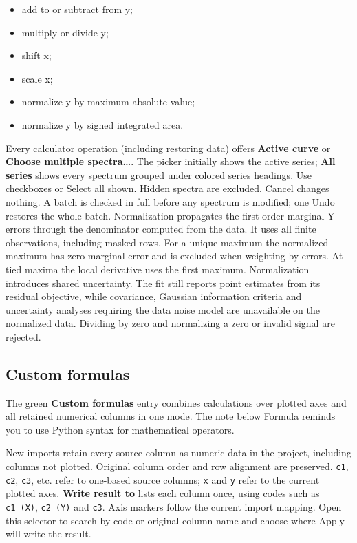 \documentclass[
  10pt,
  a4paper,
  oneside]{scrreprt}
\providecommand{\tightlist}{%
  \setlength{\itemsep}{0pt}\setlength{\parskip}{0pt}}
\begin{document}
\begin{itemize}
\tightlist
\item
  add to or subtract from y;
\item
  multiply or divide y;
\item
  shift x;
\item
  scale x;
\item
  normalize y by maximum absolute value;
\item
  normalize y by signed integrated area.
\end{itemize}

Every calculator operation (including restoring data) offers
\textbf{Active curve} or \textbf{Choose multiple spectra\ldots{}}. The
picker initially shows the active series; \textbf{All series} shows
every spectrum grouped under colored series headings. Use checkboxes or
Select all shown. Hidden spectra are excluded. Cancel changes nothing. A
batch is checked in full before any spectrum is modified; one Undo
restores the whole batch. Normalization propagates the first-order
marginal Y errors through the denominator computed from the data. It
uses all finite observations, including masked rows. For a unique
maximum the normalized maximum has zero marginal error and is excluded
when weighting by errors. At tied maxima the local derivative uses the
first maximum. Normalization introduces shared uncertainty. The fit
still reports point estimates from its residual objective, while
covariance, Gaussian information criteria and uncertainty analyses
requiring the data noise model are unavailable on the normalized data.
Dividing by zero and normalizing a zero or invalid signal are rejected.

\hypertarget{custom-formulas}{%
\subsection{Custom formulas}\label{custom-formulas}}

The green \textbf{Custom formulas} entry combines calculations over
plotted axes and all retained numerical columns in one mode. The note
below Formula reminds you to use Python syntax for mathematical
operators.

New imports retain every source column as numeric data in the project,
including columns not plotted. Original column order and row alignment
are preserved. \texttt{c1}, \texttt{c2}, \texttt{c3}, etc. refer to
one-based source columns; \texttt{x} and \texttt{y} refer to the current
plotted axes. \textbf{Write result to} lists each column once, using
codes such as \texttt{c1\ (X)}, \texttt{c2\ (Y)} and \texttt{c3}. Axis
markers follow the current import mapping. Open this selector to search
by code or original column name and choose where Apply will write the
result.
\end{document}
